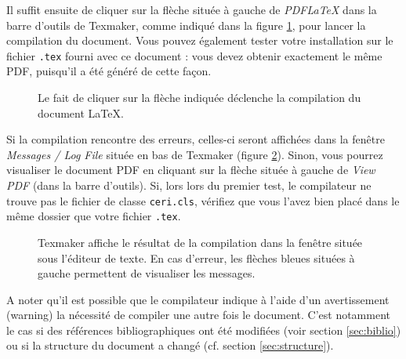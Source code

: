 \documentclass{ceri}
\begin{document}
Il suffit ensuite de cliquer sur la flèche située à gauche de \textit{PDFLaTeX} dans la barre d'outils de Texmaker, comme indiqué dans la figure \ref{fig:compilation}, pour lancer la compilation du document. Vous pouvez également tester votre installation sur le fichier \texttt{.tex} fourni avec ce document : vous devez obtenir exactement le même PDF, puisqu'il a été généré de cette façon.

\begin{figure}[htb]
	\centering
	\caption{Le fait de cliquer sur la flèche indiquée déclenche la compilation du document \LaTeX{}.}
	\label{fig:compilation}
\end{figure}

Si la compilation rencontre des erreurs, celles-ci seront affichées dans la fen\^etre \textit{Messages / Log File} située en bas de Texmaker (figure \ref{fig:log}). Sinon, vous pourrez visualiser le document PDF en cliquant sur la flèche située à gauche de \textit{View PDF} (dans la barre d'outils). Si, lors lors du premier test, le compilateur ne trouve pas le fichier de classe \texttt{ceri.cls}, vérifiez que vous l'avez bien placé dans le même dossier que votre fichier \texttt{.tex}.

\begin{figure}[htb]
	\centering
	\caption{Texmaker affiche le résultat de la compilation dans la fen\^etre située sous l'éditeur de texte. En cas d'erreur, les flèches bleues situées à gauche permettent de visualiser les messages.}
	\label{fig:log}
\end{figure}

A noter qu'il est possible que le compilateur indique à l'aide d'un avertissement (warning) la nécessité de compiler une autre fois le document. C'est notamment le cas si des références bibliographiques ont été modifiées (voir section \ref{sec:biblio}) ou si la structure du document a changé (cf\@. section \ref{sec:structure}).
\end{document}
